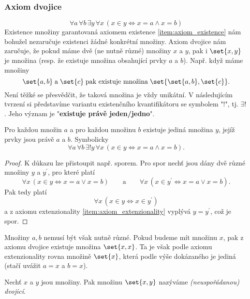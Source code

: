 \subsubsection{Axiom dvojice}
\begin{equation*}
    \forall a\,\forall b\,\exists y\,\forall x\,(x \in y \iff x=a \land x=b)
\end{equation*}
Existence množiny garantovaná axiomem existence \ref{item:axiom_existence} nám bohužel nezaručuje existenci žádné konkrétní množiny. Axiom dvojice nám zaručuje, že pokud máme dvě (ne nutně různé) množiny $x$ a $y$, pak i $\set{x,y}$ je množina (resp. že existuje množina obsahující prvky $a$ a $b$). Např. když máme množiny
\begin{equation*}
    \set{a,b}\;\text{a}\;\set{c}\;\text{pak existuje množina}\;\set{\set{a,b},\set{c}}.
\end{equation*}
Není těžké se přesvědčit, že taková množina je vždy unikátní. V následujícím tvrzení si představíme variantu existenčního kvantifikátoru se symbolem "$!$", tj. $\exists!$. Jeho význam je "\textbf{existuje právě jeden/jedno}".
\begin{lemma}
    Pro každou množin $a$ a pro každou množinu $b$ existuje jediná množina $y$, jejíž prvky jsou právě $a$ a $b$. Symbolicky
    \begin{equation*}
        \forall a\,\forall b\,\exists!y\,\forall x\,(x \in y \iff x=a \land x=b).
    \end{equation*}
\end{lemma}
\begin{proof}
    K důkazu lze přistoupit např. sporem. Pro spor nechť jsou dány dvě různé množiny $y$ a $y^\prime$, pro které platí
    \begin{equation*}
        \forall x\,(x\in y \iff x=a \lor x=b)\qquad \text{a}\qquad\forall x\, (x\in y^\prime \iff x=a \lor x=b).
    \end{equation*}
    Pak tedy platí
    \begin{equation*}
        \forall x\,(x\in y \iff x\in y^\prime)
    \end{equation*}
    a z axiomu extenzionality \ref{item:axiom_extenzionality} vyplývá $y=y^\prime$, což je spor.
\end{proof}
Množiny $a,b$ nemusí být však nutně různé. Pokud budeme mít množinu $x$, pak z axiomu dvojice existuje množina $\set{x,x}$. Ta je však podle axiomu extenzionality rovna množině $\set{x}$, která podle výše dokázaného je jediná (stačí uvážit $a=x$ a $b=x$).
\begin{definition}
    Nechť $x$ a $y$ jsou množiny. Pak množinu $\set{x,y}$ nazýváme \emph{(neuspořádanou) dvojicí}.
\end{definition}
